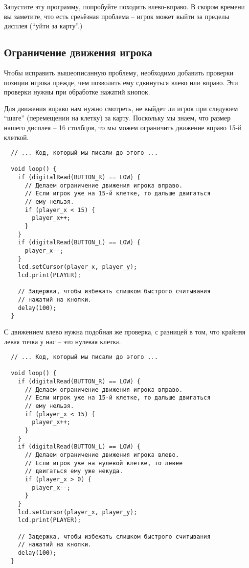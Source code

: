 \documentclass[../sparc.tex]{subfiles}
\begin{document}
Запустите эту программу, попробуйте походить влево-вправо.  В скором времени вы
заметите, что есть среьёзная проблема -- игрок может выйти за пределы дисплея
(``уйти за карту''.)

\subsection{Ограничение движения игрока}

Чтобы исправить вышеописанную проблему, необходимо добавить проверки позиции
игрока прежде, чем позволить ему сдвинуться влево или вправо.  Эти проверки
нужны при обработке нажатий кнопок.

Для движения вправо нам нужно смотреть, не выйдет ли игрок при следуюем ``шаге''
(перемещении на клетку) за карту.  Поскольку мы знаем, что размер нашего дисплея
-- 16 столбцов, то мы можем ограничить движение вправо 15-й клеткой.

\begin{verbatim}
  // ... Код, который мы писали до этого ...

  void loop() {
    if (digitalRead(BUTTON_R) == LOW) {
      // Делаем ограничение движения игрока вправо.
      // Если игрок уже на 15-й клетке, то дальше двигаться
      // ему нельзя.
      if (player_x < 15) {
        player_x++;
      }
    }
    if (digitalRead(BUTTON_L) == LOW) {
      player_x--;
    }
    lcd.setCursor(player_x, player_y);
    lcd.print(PLAYER);

    // Задержка, чтобы избежать слишком быстрого считывания
    // нажатий на кнопки.
    delay(100);
  }
\end{verbatim}

С движением влево нужна подобная же проверка, с разницей в том, что крайняя
левая точка у нас -- это нулевая клетка.

\begin{verbatim}
  // ... Код, который мы писали до этого ...

  void loop() {
    if (digitalRead(BUTTON_R) == LOW) {
      // Делаем ограничение движения игрока вправо.
      // Если игрок уже на 15-й клетке, то дальше двигаться
      // ему нельзя.
      if (player_x < 15) {
        player_x++;
      }
    }
    if (digitalRead(BUTTON_L) == LOW) {
      // Делаем ограничение движения игрока влево.
      // Если игрок уже на нулевой клетке, то левее
      // двигаться ему уже некуда.
      if (player_x > 0) {
        player_x--;
      }
    }
    lcd.setCursor(player_x, player_y);
    lcd.print(PLAYER);

    // Задержка, чтобы избежать слишком быстрого считывания
    // нажатий на кнопки.
    delay(100);
  }
\end{verbatim}
\end{document}
